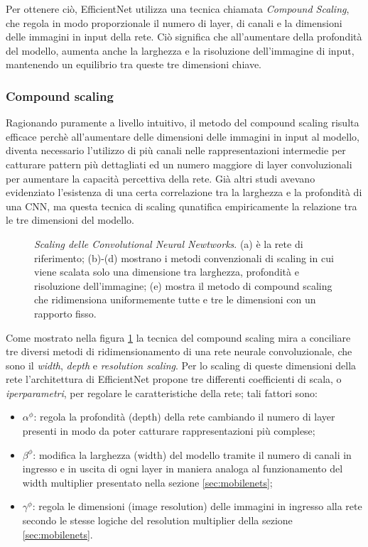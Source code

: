 Per ottenere ciò, EfficientNet utilizza una tecnica chiamata \textit{Compound Scaling}, che regola in modo proporzionale il numero di layer, di canali e la dimensioni delle immagini in input della rete. Ciò significa che all'aumentare della profondità del modello, aumenta anche la larghezza e la risoluzione dell'immagine di input, mantenendo un equilibrio tra queste tre dimensioni chiave.


\subsubsection{Compound scaling}

Ragionando puramente a livello intuitivo, il metodo del compound scaling risulta efficace perchè all'aumentare delle dimensioni delle immagini in input al modello, diventa necessario l'utilizzo di più canali nelle rappresentazioni intermedie per catturare pattern più dettagliati ed un numero maggiore di layer convoluzionali per aumentare la capacità percettiva della rete. Già altri studi avevano evidenziato l'esistenza di una certa correlazione tra la larghezza e la profondità di una CNN, ma questa tecnica di scaling qunatifica empiricamente la relazione tra le tre dimensioni del modello.

\begin{figure}[ht!]
    \centering
    \caption{\textit{Scaling delle Convolutional Neural Newtworks}. (a) è la rete di riferimento; (b)-(d) mostrano i metodi convenzionali di scaling in cui viene scalata solo una dimensione tra larghezza, profondità e risoluzione dell'immagine; (e) mostra il metodo di compound scaling che ridimensiona uniformemente tutte e tre le dimensioni con un rapporto fisso.}
    \label{fig:scaling}
\end{figure}

Come mostrato nella figura \ref{fig:scaling} la tecnica del compound scaling mira a conciliare tre diversi metodi di ridimensionamento di una rete neurale convoluzionale, che sono il \textit{width}, \textit{depth} e \textit{resolution scaling}. 
Per lo scaling di queste dimensioni della rete l'architettura di EfficientNet propone tre differenti coefficienti di scala, o \textit{iperparametri}, per regolare le caratteristiche della rete; tali fattori sono:
\begin{itemize}
    \item $\alpha^{\phi}$: regola la profondità (depth) della rete cambiando il numero di layer presenti in modo da poter catturare rappresentazioni più complese;
    \item $\beta^{\phi}$: modifica la larghezza (width) del modello tramite il numero di canali in ingresso e in uscita di ogni layer in maniera analoga al funzionamento del width multiplier presentato nella sezione \ref{sec:mobilenets};
    \item $\gamma^{\phi}$: regola le dimensioni (image resolution) delle immagini in ingresso alla rete secondo le stesse logiche del resolution multiplier della sezione \ref{sec:mobilenets}.
\end{itemize}

